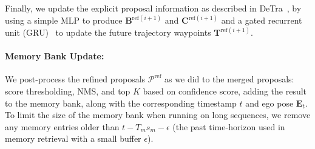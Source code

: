Finally, we update the explicit proposal information as described in DeTra~\cite{casas2024detra}, by using a simple MLP to produce $\mathbf{B}^{\mathrm{ref}(i+1)}$ and $\mathbf{C}^{\mathrm{ref}(i+1)}$ and a gated recurrent unit (GRU)~\cite{cho2014learning} to update the future trajectory waypoints $\mathbf{T}^{\mathrm{ref}(i+1)}$.

\paragraph{Memory Bank Update:}
We post-process the refined proposals $\mathcal{P}^{\mathrm{ref}}$ as we did to the merged proposals: score thresholding,
NMS, and top $K$ based on confidence score,
adding the result to the memory bank, along with the corresponding timestamp $t$ and ego pose $\mathbf{E}_t$.
To limit the size of the memory bank when running on long sequences,
we remove any memory entries older than $t - T_m s_m - \epsilon$ (the past time-horizon used in memory retrieval with a small buffer $\epsilon$).